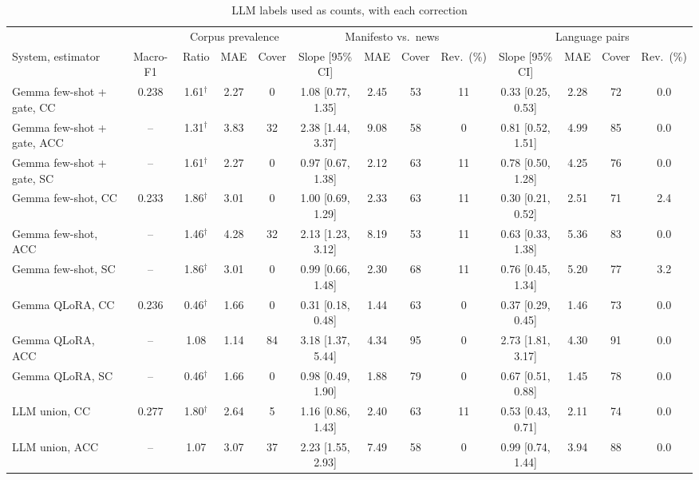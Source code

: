 \begin{table}[t]
\caption{LLM labels used as counts, with each correction}
\label{tab:llm}
\centering
\scriptsize
\setlength{\tabcolsep}{2.5pt}
\begin{tabular*}{\textwidth}{@{\extracolsep{\fill}}lcccccccccccc@{}}
\toprule
 & & \multicolumn{3}{c}{Corpus prevalence} & \multicolumn{4}{c}{Manifesto vs.\ news} & \multicolumn{4}{c}{Language pairs} \\
\cmidrule(lr){3-5}\cmidrule(lr){6-9}\cmidrule(l){10-13}
System, estimator & Macro-F1 & Ratio & MAE & Cover & Slope [95\% CI] & MAE & Cover & Rev.\ (\%) & Slope [95\% CI] & MAE & Cover & Rev.\ (\%) \\
\midrule
Gemma few-shot + gate, CC & 0.238 & 1.61$^\dagger$ & 2.27 & 0 & 1.08 [0.77, 1.35] & 2.45 & 53 & 11 & 0.33 [0.25, 0.53] & 2.28 & 72 & 0.0 \\
Gemma few-shot + gate, ACC & -- & 1.31$^\dagger$ & 3.83 & 32 & 2.38 [1.44, 3.37] & 9.08 & 58 & 0 & 0.81 [0.52, 1.51] & 4.99 & 85 & 0.0 \\
Gemma few-shot + gate, SC & -- & 1.61$^\dagger$ & 2.27 & 0 & 0.97 [0.67, 1.38] & 2.12 & 63 & 11 & 0.78 [0.50, 1.28] & 4.25 & 76 & 0.0 \\
\addlinespace
Gemma few-shot, CC & 0.233 & 1.86$^\dagger$ & 3.01 & 0 & 1.00 [0.69, 1.29] & 2.33 & 63 & 11 & 0.30 [0.21, 0.52] & 2.51 & 71 & 2.4 \\
Gemma few-shot, ACC & -- & 1.46$^\dagger$ & 4.28 & 32 & 2.13 [1.23, 3.12] & 8.19 & 53 & 11 & 0.63 [0.33, 1.38] & 5.36 & 83 & 0.0 \\
Gemma few-shot, SC & -- & 1.86$^\dagger$ & 3.01 & 0 & 0.99 [0.66, 1.48] & 2.30 & 68 & 11 & 0.76 [0.45, 1.34] & 5.20 & 77 & 3.2 \\
\addlinespace
Gemma QLoRA, CC & 0.236 & 0.46$^\dagger$ & 1.66 & 0 & 0.31 [0.18, 0.48] & 1.44 & 63 & 0 & 0.37 [0.29, 0.45] & 1.46 & 73 & 0.0 \\
Gemma QLoRA, ACC & -- & 1.08 & 1.14 & 84 & 3.18 [1.37, 5.44] & 4.34 & 95 & 0 & 2.73 [1.81, 3.17] & 4.30 & 91 & 0.0 \\
Gemma QLoRA, SC & -- & 0.46$^\dagger$ & 1.66 & 0 & 0.98 [0.49, 1.90] & 1.88 & 79 & 0 & 0.67 [0.51, 0.88] & 1.45 & 78 & 0.0 \\
\addlinespace
LLM union, CC & 0.277 & 1.80$^\dagger$ & 2.64 & 5 & 1.16 [0.86, 1.43] & 2.40 & 63 & 11 & 0.53 [0.43, 0.71] & 2.11 & 74 & 0.0 \\
LLM union, ACC & -- & 1.07 & 3.07 & 37 & 2.23 [1.55, 2.93] & 7.49 & 58 & 0 & 0.99 [0.74, 1.44] & 3.94 & 88 & 0.0 \\

\end{tabular*}
\end{table}
